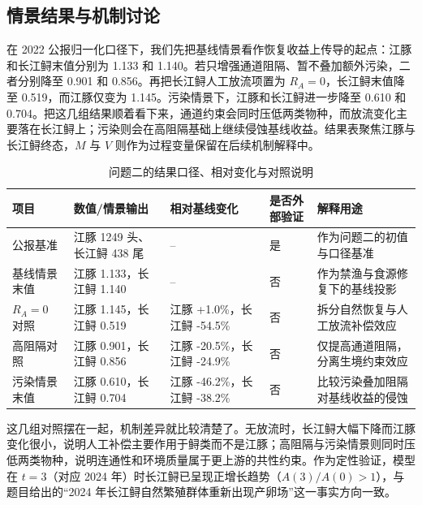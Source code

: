 \subsection{情景结果与机制讨论}
在 2022 公报归一化口径下，我们先把基线情景看作恢复收益上传导的起点：江豚和长江鲟末值分别为 1.133 和 1.140。若只增强通道阻隔、暂不叠加额外污染，二者分别降至 0.901 和 0.856。再把长江鲟人工放流项置为 $R_A=0$，长江鲟末值降至 0.519，而江豚仅变为 1.145。污染情景下，江豚和长江鲟进一步降至 0.610 和 0.704。把这几组结果顺着看下来，通道约束会同时压低两类物种，而放流变化主要落在长江鲟上；污染则会在高阻隔基础上继续侵蚀基线收益。结果表聚焦江豚与长江鲟终态，$M$ 与 $V$ 则作为过程变量保留在后续机制解释中。
\begin{table}[htbp]
\centering
\caption{问题二的结果口径、相对变化与对照说明}
\label{tab:q2_result}
\begin{tabularx}{0.95\textwidth}{>{\raggedright\arraybackslash}p{2.2cm} >{\raggedright\arraybackslash}p{3.6cm} >{\raggedright\arraybackslash}p{2.8cm} >{\raggedright\arraybackslash}p{1.7cm} X}
\toprule
项目 & 数值/情景输出 & 相对基线变化 & 是否外部验证 & 解释用途 \\
\midrule
2022 公报基准 & 江豚 1249 头、长江鲟 438 尾 & -- & 是 & 作为问题二的初值与口径基准 \\
基线情景末值 & 江豚 1.133，长江鲟 1.140 & -- & 否 & 作为禁渔与食源修复下的基线投影 \\
$R_A=0$ 对照 & 江豚 1.145，长江鲟 0.519 & 江豚 +1.0\%，长江鲟 -54.5\% & 否 & 拆分自然恢复与人工放流补偿效应 \\
高阻隔对照 & 江豚 0.901，长江鲟 0.856 & 江豚 -20.5\%，长江鲟 -24.9\% & 否 & 仅提高通道阻隔，分离生境约束效应 \\
污染情景末值 & 江豚 0.610，长江鲟 0.704 & 江豚 -46.2\%，长江鲟 -38.2\% & 否 & 比较污染叠加阻隔对基线收益的侵蚀 \\
\bottomrule
\end{tabularx}
\end{table}
这几组对照摆在一起，机制差异就比较清楚了。无放流时，长江鲟大幅下降而江豚变化很小，说明人工补偿主要作用于鲟类而不是江豚；高阻隔与污染情景则同时压低两类物种，说明连通性和环境质量属于更上游的共性约束。作为定性验证，模型在 $t=3$（对应 2024 年）时长江鲟已呈现正增长趋势（$A(3)/A(0)>1$），与题目给出的“2024 年长江鲟自然繁殖群体重新出现产卵场”这一事实方向一致。

